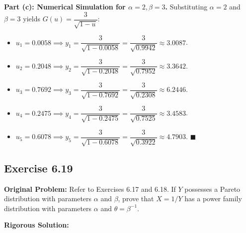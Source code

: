 \documentclass[11pt, letterpaper]{article}
\theoremstyle{definition}
\theoremstyle{remark}
\begin{document}
\textbf{Part (c): Numerical Simulation for $\alpha = 2, \beta = 3$.}
Substituting $\alpha = 2$ and $\beta = 3$ yields $G(u) = \dfrac{3}{\sqrt{1 - u}}$:
\begin{itemize}
    \item $u_1 = 0.0058 \implies y_1 = \dfrac{3}{\sqrt{1 - 0.0058}} = \dfrac{3}{\sqrt{0.9942}} \approx 3.0087$.
    \item $u_2 = 0.2048 \implies y_2 = \dfrac{3}{\sqrt{1 - 0.2048}} = \dfrac{3}{\sqrt{0.7952}} \approx 3.3642$.
    \item $u_3 = 0.7692 \implies y_3 = \dfrac{3}{\sqrt{1 - 0.7692}} = \dfrac{3}{\sqrt{0.2308}} \approx 6.2446$.
    \item $u_4 = 0.2475 \implies y_4 = \dfrac{3}{\sqrt{1 - 0.2475}} = \dfrac{3}{\sqrt{0.7525}} \approx 3.4583$.
    \item $u_5 = 0.6078 \implies y_5 = \dfrac{3}{\sqrt{1 - 0.6078}} = \dfrac{3}{\sqrt{0.3922}} \approx 4.7903$. \hfill $\blacksquare$
\end{itemize}

\subsection{Exercise 6.19}

\textbf{Original Problem:}
Refer to Exercises 6.17 and 6.18. If $Y$ possesses a Pareto distribution with parameters $\alpha$ and $\beta$, prove that $X = 1/Y$ has a power family distribution with parameters $\alpha$ and $\theta = \beta^{-1}$.

\hrulefill

\textbf{Rigorous Solution:}
\end{document}
